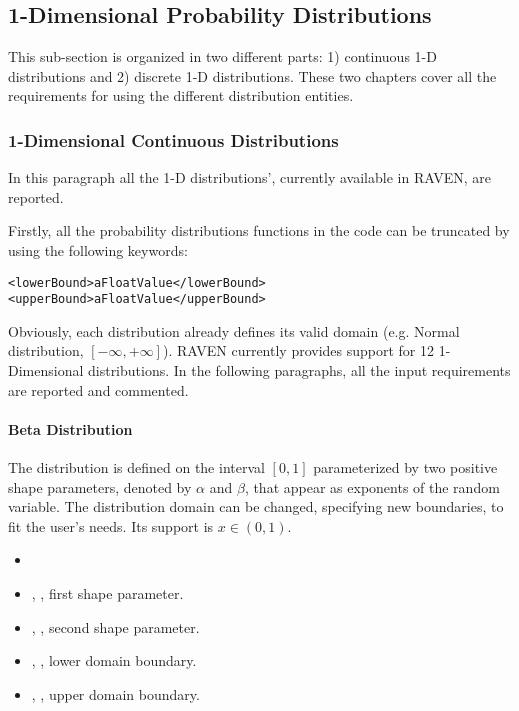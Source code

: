 \subsection{1-Dimensional Probability Distributions}
\label{subsec:1dDist}
This sub-section is organized in two different parts: 1) continuous 1-D
distributions and 2) discrete 1-D distributions.
%
These two chapters cover all the requirements for using the different
distribution entities.
%
\subsubsection{1-Dimensional Continuous Distributions}
\label{subsubsec:1DContinuous}
In this paragraph all the 1-D distributions', currently available in RAVEN, are
reported.

Firstly, all the probability distributions functions in the code can be
truncated by using the following keywords:
\begin{lstlisting}[style=XML]
<lowerBound>aFloatValue</lowerBound>
<upperBound>aFloatValue</upperBound>
\end{lstlisting}
Obviously, each distribution already defines its valid domain (e.g. Normal
distribution, $[-\infty,+\infty]$).
%
RAVEN currently provides support for 12 1-Dimensional distributions.
%
In the following paragraphs, all the input requirements are reported and
commented.

\paragraph{Beta Distribution}
\label{Beta}
The  distribution is defined on the
interval $[0,1]$ parameterized by two positive shape parameters, denoted by
$\alpha$ and $\beta$, that appear as exponents of the random variable.
%
The distribution domain can be changed, specifying new boundaries, to fit the
user's needs.
%
Its support is $x \in (0, 1)$.

%
\attrIntro
\vspace{-5mm}
\begin{itemize}
  \itemsep0em
  \item \nameDescription
\end{itemize}
\vspace{-5mm}
\subnodesIntro
\begin{itemize}
  \item {}, , first shape
  parameter.
  \item {}, , second shape
  parameter.
  \item {}, , lower domain
  boundary.
  \item {}, , upper domain
  boundary.
\end{itemize}

